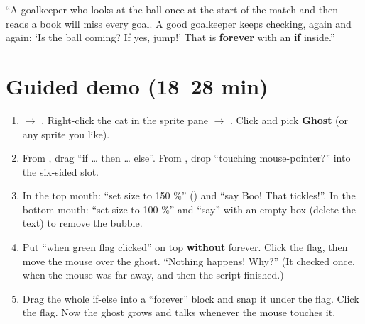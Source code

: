 \begin{analogy}
\enquote{A goalkeeper who looks at the ball once at the start of the match and then reads a book will miss every goal. A good goalkeeper keeps checking, again and again: \enquote{Is the ball coming? If yes, jump!} That is \textbf{forever} with an \textbf{if} inside.}
\end{analogy}

\section{Guided demo (18--28 min)}
\begin{workedexample}
\par\noindent\begin{minipage}[t]{0.56\linewidth}
\begin{enumerate}[leftmargin=1.4em,itemsep=1pt]
  \item {} $\rightarrow$ . Right-click the cat in the sprite pane $\rightarrow$ . Click  and pick \textbf{Ghost} (or any sprite you like).
  \item From , drag \enquote{if \ldots{} then \ldots{} else}. From , drop \enquote{touching mouse-pointer?} into the six-sided slot.
  \item In the top mouth: \enquote{set size to 150 \%} () and \enquote{say Boo! That tickles!}. In the bottom mouth: \enquote{set size to 100 \%} and \enquote{say} with an empty box (delete the text) to remove the bubble.
  \item Put \enquote{when green flag clicked} on top \textbf{without} forever. Click the flag, then move the mouse over the ghost. \enquote{Nothing happens! Why?} (It checked once, when the mouse was far away, and then the script finished.)
  \item Drag the whole if-else into a \enquote{forever} block and snap it under the flag. Click the flag. Now the ghost grows and talks whenever the mouse touches it.
\end{enumerate}
\end{minipage}\hfill
\begin{minipage}[t]{0.40\linewidth}\vspace{4pt}\centering
\begin{scratch}[scale=0.66,else word=else]
\end{scratch}
\end{minipage}

\end{workedexample}


